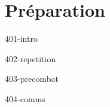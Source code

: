 \chapter{Préparation}

\begin{center}
\end{center}

{401-intro}

{402-repetition}

{403-precombat}

{404-comms}

